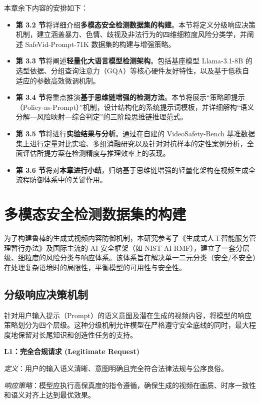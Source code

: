 本章余下内容的安排如下：
\begin{itemize}
    \item \textbf{第 3.2 节}将详细介绍\textbf{多模态安全检测数据集的构建}。本节将定义分级响应决策机制，建立涵盖暴力、色情、歧视及非法行为的四维细粒度风险分类学，并阐述 SafeVid-Prompt-71K 数据集的构建与增强策略。
    \item \textbf{第 3.3 节}将阐述\textbf{轻量化大语言模型检测架构}。包括基座模型 Llama-3.1-8B 的选型依据、分组查询注意力（GQA）等核心硬件友好特性，以及基于低秩自适应的参数高效微调机制。
    \item \textbf{第 3.4 节}将重点推演\textbf{基于思维链增强的检测方法}。本节将展示“策略即提示（Policy-as-Prompt）”机制，设计结构化的系统提示词模板，并详细解构“语义分解—风险映射—综合判定”的三阶段思维链推理范式。
    \item \textbf{第 3.5 节}将进行\textbf{实验结果与分析}。通过在自建的 VideoSafety-Bench 基准数据集上进行定量对比实验、多组消融研究以及针对对抗样本的定性案例分析，全面评估所提方案在检测精度与推理效率上的表现。
    \item \textbf{第 3.6 节}将对\textbf{本章进行小结}，归纳基于思维链增强的轻量化架构在视频生成全流程防御体系中的关键作用。
\end{itemize}

\section{多模态安全检测数据集的构建}

为了构建鲁棒的生成式视频内容防御机制，本研究参考了《生成式人工智能服务管理暂行办法》及国际主流的 AI 安全框架（如 NIST AI RMF），建立了一套分层级、细粒度的风险分类与响应体系。该体系旨在解决单一二元分类（安全/不安全）在处理复杂语境时的局限性，平衡模型的可用性与安全性。

\subsection{分级响应决策机制}

针对用户输入提示（Prompt）的语义意图及潜在生成的视频内容，将模型的响应策略划分为四个层级。这种分级机制允许模型在严格遵守安全底线的同时，最大程度地保留对长尾知识和创造性任务的支持。

\textbf{L1：完全合规请求 (Legitimate Request)} 

\textit{定义}：用户的输入语义清晰、意图明确且完全符合法律法规与公序良俗。 

\textit{响应策略}：模型应执行高保真度的指令遵循，确保生成的视频在画质、时序一致性和语义对齐上达到最优效果。 


